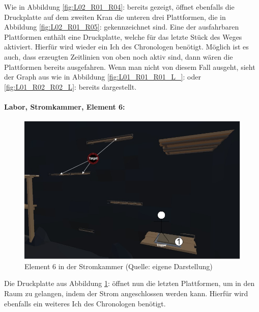 Wie in Abbildung \ref{fig:L02_R01_R04}:  bereits gezeigt, öffnet ebenfalls die Druckplatte auf dem zweiten Kran die unteren drei Plattformen, die in Abbildung \ref{fig:L02_R01_R05}:  gekennzeichnet sind. Eine der ausfahrbaren Plattformen enthält eine Druckplatte, welche für das letzte Stück des Weges aktiviert. Hierfür wird wieder ein Ich des Chronologen benötigt. Möglich ist es auch, dass erzeugten Zeitlinien von oben noch aktiv sind, dann wären die Plattformen bereits ausgefahren. Wenn man nicht von diesem Fall ausgeht, sieht der Graph aus wie in Abbildung \ref{fig:L01_R01_R01_L_}:  oder \ref{fig:L01_R02_R02_L}:  bereits dargestellt.

\paragraph{Labor, Stromkammer, Element 6:}\label{p:lse6}

\begin{figure}[ht]
\centering
\includegraphics[width=0.8\linewidth]{content/pictures/Raetsel-L02_R01_R06.jpg}
\caption{Element 6 in der Stromkammer (Quelle: eigene Darstellung)}
\label{fig:L02_R01_R06}
\end{figure}

Die Druckplatte aus Abbildung \ref{fig:L02_R01_R06}:  öffnet nun die letzten Plattformen, um in den Raum zu gelangen, indem der Strom angeschlossen werden kann. Hierfür wird ebenfalls ein weiteres Ich des Chronologen benötigt.

